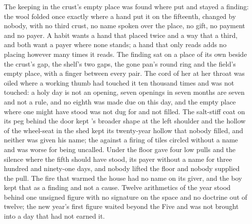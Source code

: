 The keeping in the crust's empty place was found where put and stayed a finding: the wool folded once exactly where a hand put it on the fifteenth, changed by nobody, with no third crust, no name spoken over the place, no gift, no payment and no payer. A habit wants a hand that placed twice and a way that a third, and both want a payer where none stands; a hand that only reads adds no placing however many times it reads. The finding sat on a place of its own beside the crust's gap, the shelf's two gaps, the gone pan's round ring and the field's empty place, with a finger between every pair. The cord of her  at her throat was oiled where a working thumb had touched it ten thousand times and was not touched: a holy day is not an opening, seven openings in seven months are seven and not a rule, and no eighth was made due on this day, and the empty place where one might have stood was not dug for and not filled. The salt-stiff coat on its peg behind the door kept 's broader shape at the left shoulder and the hollow of the wheel-seat in the shed kept its twenty-year hollow that nobody filled, and neither was given his name; the  against a firing of tiles circled without a name and was worse for being uncalled. Under the floor  gave four low pulls and the silence where the fifth should have stood, its payer without a name for three hundred and ninety-one days, and nobody lifted the floor and nobody supplied the pull. The fire that warmed the house had no name on its giver, and the boy kept that as a finding and not a cause. Twelve arithmetics of the year stood behind one unsigned figure with no signature on the space and no doctrine out of twelve; the new year's first figure waited beyond the Five and was not brought into a day that had not earned it.

